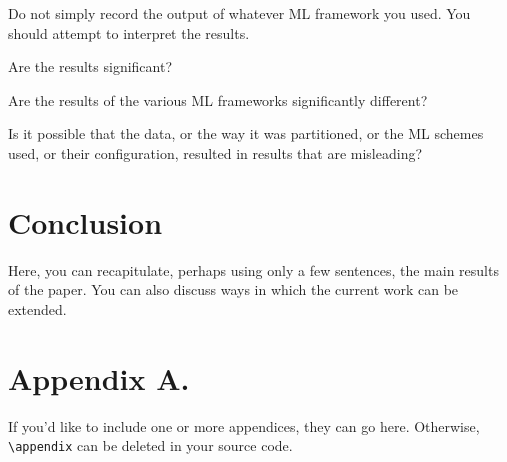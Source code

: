 \documentclass[jair,twoside,11pt,theapa]{article}
\begin{document}
Do not simply record the output of whatever ML framework you used. You should attempt to interpret the results.

{\color{blue}\begin{compactenum}
\item Are the results significant?
\item Are the results of the various ML frameworks significantly different?
\item Is it possible that the data, or the way it was partitioned, or the ML schemes used, or their configuration, resulted in results that are misleading?
\end{compactenum}}



\section{Conclusion}

 Here, you can recapitulate, perhaps using only a few sentences, the main results of the paper. You can also discuss ways in which the current work can be extended.


\appendix
\section*{Appendix A.}

If you'd like to include one or more appendices, they can go here. Otherwise, \verb"\appendix"  can be deleted in your source code.

\vskip 0.2in


\end{document}
